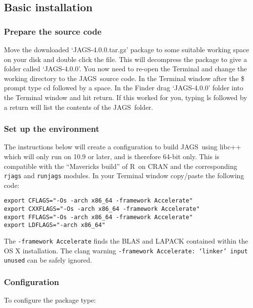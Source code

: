 \documentclass[11pt, a4paper, titlepage]{article}
\newcommand{\release}{4.0.0}
\newcommand{\JAGS}{\textsf{JAGS}}
\newcommand{\R}{\textsf{R}}
\newcommand{\code}[1]{{\bgroup{\normalfont\ttfamily #1}\egroup}}
\newcommand{\file}[1]{{`\normalfont\textsf{#1}'}}
\begin{document}
\subsection{Basic installation}


\subsubsection{Prepare the source code}

Move the downloaded \file{JAGS-\release.tar.gz} package to some suitable
working space on your disk and double click the file.  This will
decompress the package to give a folder called \file{JAGS-\release}.  
You now need to re-open the Terminal and
change the working directory to the \JAGS\ source code. In the Terminal
window after the \$ prompt type \code{cd} followed by a space.  In the Finder
drag \file{JAGS-\release} folder into the Terminal window and hit return.  If this
worked for you, typing \code{ls} followed by a return will list the contents
of the \JAGS\ folder.


\subsubsection{Set up the environment}
\label{section:osxenvironment}

The instructions below will create a configuration to build \JAGS\ using 
libc++ which will only run on 10.9 or later, and is therefore 64-bit only.
This is compatible with the ``Mavericks build'' of \R\ on CRAN and the 
corresponding \texttt{rjags} and \texttt{runjags} modules.  
In your Terminal window copy/paste the following code:

\begin{verbatim}
export CFLAGS="-Os -arch x86_64 -framework Accelerate"
export CXXFLAGS="-Os -arch x86_64 -framework Accelerate"
export FFLAGS="-Os -arch x86_64 -framework Accelerate"
export LDFLAGS="-arch x86_64"
\end{verbatim}

The \texttt{-framework Accelerate} finds the BLAS and LAPACK 
contained within the OS X installation.  The clang warning
\texttt{-framework Accelerate: `linker' input unused} can
be safely ignored.

\subsubsection{Configuration}

To configure the package type:
\end{document}
